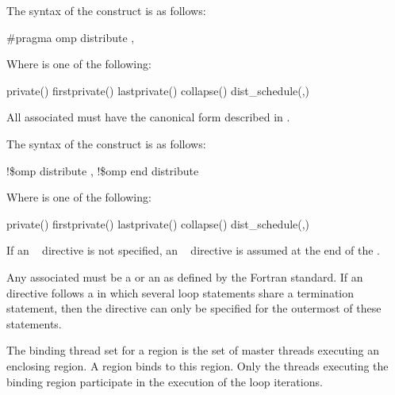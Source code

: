 {{{{\syntax
\ccppspecificstart
The syntax of the  construct is as follows:

\begin{boxedcode}
\#pragma omp distribute \plc{[clause[ [},\plc{] clause] ... ] new-line}
\end{boxedcode}

Where  is one of the following:

\begin{indentedcodelist}
private()
firstprivate()
lastprivate()
collapse()
dist\_schedule(\plc{kind[},\plc{ chunk\_size]})
\end{indentedcodelist}

All associated  must have the canonical form described in 
.
\ccppspecificend
\bigskip

\fortranspecificstart
The syntax of the  construct is as follows:

\begin{boxedcode}
!\$omp distribute \plc{[clause[ [},\plc{] clause] ... ]}
\plc{[}!\$omp end distribute\plc{]}
\end{boxedcode}

Where  is one of the following:

\begin{indentedcodelist}
private()
firstprivate()
lastprivate()
collapse()
dist\_schedule(\plc{kind[},\plc{ chunk\_size]})
\end{indentedcodelist}

If an ~ directive is not specified, an ~ directive 
is assumed at the end of the .

Any associated  must be a  or an
 as defined by the Fortran standard. If an 
~ directive follows a  in which several loop statements share a  
termination statement, then the directive can only be specified for the outermost of these 
 statements.
\fortranspecificend

\begin{samepage}

\binding
The binding thread set for a  region is the set of master
threads executing an enclosing  region. A  region
binds to this  region. Only the threads executing the binding  region participate in the 
execution of the loop iterations.


\end{samepage}}}}}
